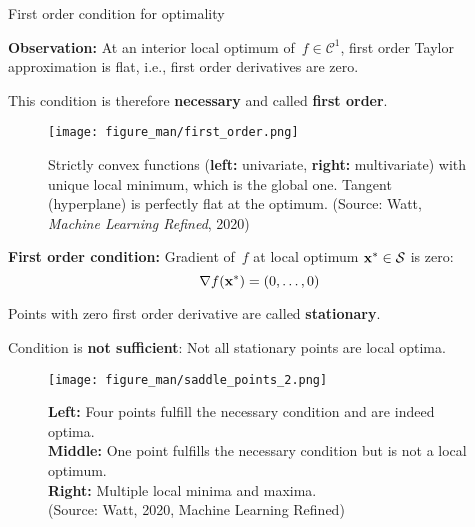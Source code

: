 \documentclass[11pt,compress,t,notes=noshow, xcolor=table]{beamer}
\begin{document}
\begin{vbframe}{First order condition for optimality}

\textbf{Observation:} At an interior local optimum of~$f\in\mathcal{C}^1$, first order Taylor approximation is flat, i.e., first order derivatives are zero.

\medskip

This condition is therefore \textbf{necessary} and called \textbf{first order}.

\begin{figure}
    \centering
    \texttt{[image: figure\_man/first\_order.png]}
    \caption*{\footnotesize
        Strictly convex functions (\textbf{left:} univariate, \textbf{right:} multivariate) with unique local minimum, which is the global one.
        Tangent (hyperplane) is perfectly flat at the optimum.
        (Source: Watt, \textit{Machine Learning Refined}, 2020)}
\end{figure}

\framebreak


\textbf{First order condition:}
Gradient of~$f$ at local optimum $\mathbf{x}^\ast \in \mathcal{S}$ is zero:
\vspace{-0.5\baselineskip}
\begin{equation*}
    \nabla f(\mathbf{x}^\ast) = (0,\ldots,0)
\end{equation*}


Points with zero first order derivative are called \textbf{stationary}.

\medskip

Condition is \textbf{not sufficient}: Not all stationary points are local optima.

\begin{figure}
    \centering
    \texttt{[image: figure\_man/saddle\_points\_2.png]}
    \captionsetup{justification=centering}
    \caption*{\footnotesize
        \textbf{Left:} Four points fulfill the necessary condition and are indeed optima. \\
        \textbf{Middle:} One point fulfills the necessary condition but is not a local optimum. \\
        \textbf{Right:} Multiple local minima and maxima. \\
        (Source: Watt, 2020, Machine Learning Refined)}
\end{figure}

\end{vbframe}
\end{document}
